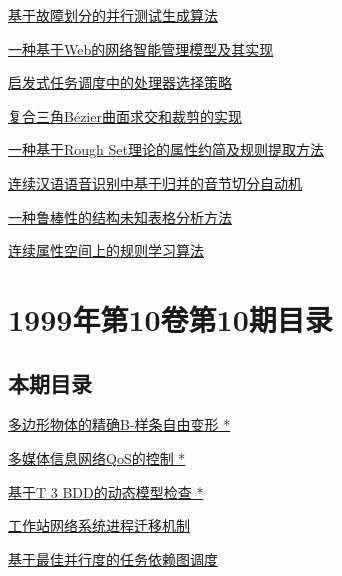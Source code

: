 \documentclass[a4paper]{article}
\begin{document}
\href{http://www.jos.org.cn/ch/reader/download_pdf.aspx?file_no=19991112&year_id=1999&quarter_id=11&falg=1}{基于故障划分的并行测试生成算法}

\href{http://www.jos.org.cn/ch/reader/download_pdf.aspx?file_no=19991113&year_id=1999&quarter_id=11&falg=1}{一种基于Web的网络智能管理模型及其实现}

\href{http://www.jos.org.cn/ch/reader/download_pdf.aspx?file_no=19991114&year_id=1999&quarter_id=11&falg=1}{启发式任务调度中的处理器选择策略}

\href{http://www.jos.org.cn/ch/reader/download_pdf.aspx?file_no=19991115&year_id=1999&quarter_id=11&falg=1}{复合三角Bézier曲面求交和裁剪的实现}

\href{http://www.jos.org.cn/ch/reader/download_pdf.aspx?file_no=19991116&year_id=1999&quarter_id=11&falg=1}{一种基于Rough Set理论的属性约简及规则提取方法}

\href{http://www.jos.org.cn/ch/reader/download_pdf.aspx?file_no=19991117&year_id=1999&quarter_id=11&falg=1}{连续汉语语音识别中基于归并的音节切分自动机}

\href{http://www.jos.org.cn/ch/reader/download_pdf.aspx?file_no=19991118&year_id=1999&quarter_id=11&falg=1}{一种鲁棒性的结构未知表格分析方法}

\href{http://www.jos.org.cn/ch/reader/download_pdf.aspx?file_no=19991119&year_id=1999&quarter_id=11&falg=1}{连续属性空间上的规则学习算法}


\section{\textbf{1999年第10卷第10期目录}}
\subsection{本期目录}
\href{http://www.jos.org.cn/ch/reader/download_pdf.aspx?file_no=19991001&year_id=1999&quarter_id=10&falg=1}{多边形物体的精确B-样条自由变形 *}

\href{http://www.jos.org.cn/ch/reader/download_pdf.aspx?file_no=19991002&year_id=1999&quarter_id=10&falg=1}{多媒体信息网络QoS的控制 *}

\href{http://www.jos.org.cn/ch/reader/download_pdf.aspx?file_no=19991003&year_id=1999&quarter_id=10&falg=1}{基于T 3 BDD的动态模型检查 *}

\href{http://www.jos.org.cn/ch/reader/download_pdf.aspx?file_no=19991004&year_id=1999&quarter_id=10&falg=1}{工作站网络系统进程迁移机制}

\href{http://www.jos.org.cn/ch/reader/download_pdf.aspx?file_no=19991005&year_id=1999&quarter_id=10&falg=1}{基于最佳并行度的任务依赖图调度}
\end{document}
